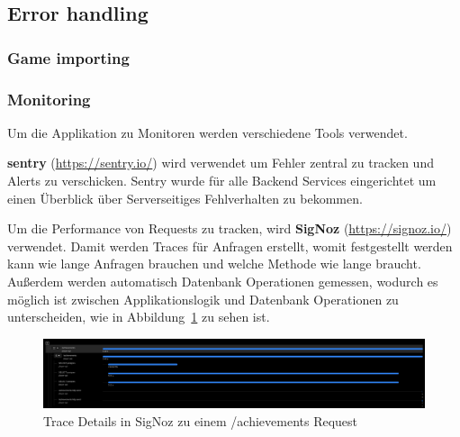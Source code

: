 \subsection{Error handling}
\subsubsection{Game importing}
\subsubsection{Monitoring}

Um die Applikation zu Monitoren werden verschiedene Tools verwendet.

\textbf{sentry} (\href{https://sentry.io/}{https://sentry.io/}) wird verwendet um Fehler zentral zu tracken und
Alerts zu verschicken.
Sentry wurde für alle Backend Services eingerichtet um einen Überblick über Serverseitiges Fehlverhalten zu bekommen.

Um die Performance von Requests zu tracken, wird \textbf{SigNoz} (\href{https://signoz.io/}{https://signoz.io/}) verwendet.
Damit werden Traces für Anfragen erstellt, womit festgestellt werden kann wie lange Anfragen brauchen und welche Methode wie lange braucht.
Außerdem werden automatisch Datenbank Operationen gemessen, wodurch es möglich ist zwischen Applikationslogik
und Datenbank Operationen zu unterscheiden, wie in Abbildung~\ref{fig:signoz-traces} zu sehen ist.
\begin{figure}
    \centering
    \includegraphics[width=\textwidth]{images/signoz_traces}
    \caption{Trace Details in SigNoz zu einem /achievements Request}
    \label{fig:signoz-traces}
\end{figure}